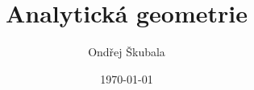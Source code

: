 \usepackage[czech]{babel}
\usepackage[T1]{fontenc}
\usepackage{amsmath, amssymb, amsthm}
\usepackage{geometry}
\usepackage{hyperref}
\usepackage{tikz}
\usepackage{tikz-3dplot}
\usepackage{pgfplots}
\usepackage{float}
\usepackage{enumitem}
\usepackage{caption}

\usetikzlibrary{arrows.meta}

\newtheorem{definition}{Definice}[section]
\newtheorem{theorem}{Věta}[section]
\newtheorem{example}{Příklad}[section]
\newtheorem{remark}{Poznámka}[section]

\providecommand*{\definitionautorefname}{Definice}
\providecommand*{\theoremautorefname}{Věta}
\providecommand*{\exampleautorefname}{Příklad}
\providecommand*{\remarkautorefname}{Poznámka}







\geometry{a4paper, margin=2.5cm}

\title{Analytická geometrie}
\author{Ondřej Škubala}
\date{\today}